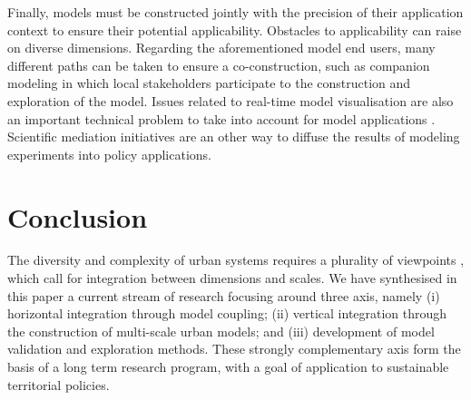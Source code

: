 Finally, models must be constructed jointly with the precision of their application context to ensure their potential applicability. Obstacles to applicability can raise on diverse dimensions. Regarding the aforementioned model end users, many different paths can be taken to ensure a co-construction, such as companion modeling \cite{drogoul2015agent} in which local stakeholders participate to the construction and exploration of the model. Issues related to real-time model visualisation are also an important technical problem to take into account for model applications \cite{milton2019accelerating}. Scientific mediation initiatives are an other way to diffuse the results of modeling experiments into policy applications.



\section{Conclusion}

The diversity and complexity of urban systems requires a plurality of viewpoints \cite{pumain2020conclusion}, which call for integration between dimensions and scales. We have synthesised in this paper a current stream of research focusing around three axis, namely (i) horizontal integration through model coupling; (ii) vertical integration through the construction of multi-scale urban models; and (iii) development of model validation and exploration methods. These strongly complementary axis form the basis of a long term research program, with a goal of application to sustainable territorial policies.


%

